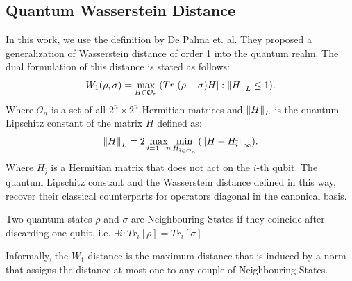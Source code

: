 \subsection{Quantum Wasserstein Distance}
In this work, we use the definition by De Palma et.
al\cite{depalma2020quantum}. They proposed a generalization of
Wasserstein distance of order 1 into the quantum realm. The dual formulation of
this distance is stated as follows:
\begin{equation}
  W_1(\rho, \sigma) = \max_{H \in \mathcal{O}_n}{(Tr[(\rho - \sigma)H]: \left\lVert H\right\rVert_L \leq 1
    )}.
  \label{eq:w1_distance_general}
\end{equation}
Where $\mathcal{O}_n$ is a set of all $2^n \times 2^n$ Hermitian matrices and 
$\left\lVert H\right\rVert_L$ is the quantum Lipschitz constant of the matrix $H$ defined as:
\begin{equation}
  \left\lVert H\right\rVert_L = 2 \max_{i=1\ldots n}{\min_{H_{\bar{i} \in \mathcal{O}_n}}{(\left\lVert H - H_{\bar{i}}\right\rVert_\infty)}}.
\end{equation}
Where $H_{\bar{i}}$ is a Hermitian matrix that does not act on the $i$-th qubit.
The quantum Lipschitz constant and the Wasserstein distance defined in this way,
recover their classical counterparts for operators diagonal in the canonical basis.

\begin{definition}
  Two quantum states $\rho$ and $\sigma$ are Neighbouring States if they
  coincide after discarding one qubit, i.e. $\exists i: Tr_i[\rho]=Tr_i[\sigma]$
\end{definition}

Informally, the $W_1$ distance is the maximum distance that is induced by a norm
that assigns the distance at most one to any couple of Neighbouring States. 

